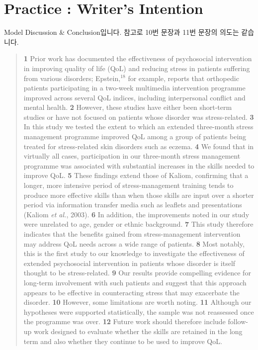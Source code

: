 \documentclass[10pt]{report}
\begin{document}
	\chapter{Practice : Writer's Intention}
	Model Discussion \& Conclusion입니다. 참고로 10번 문장과 11번 문장의 의도는 같습니다.
	\begin{quote}
		{\bf 1} Prior work has documented the effectiveness of psychosocial intervention in improving quality of life (QoL) and reducing stress in patients suffering from various disorders; Epstein,$^{18}$ for example, reports that orthopedic patients participating in a two-week multimedia intervention programme improved across several QoL indices, including interpersonal conflict and mental health. {\bf 2} However, these studies have either been short-term studies or have not focused on patients whose disorder was stress-related. {\bf 3} In this study we tested the extent to which an extended three-month stress management programme improved QoL among a group of patients being treated for stress-related skin disorders such as eczema. {\bf 4} We found that in virtually all cases, participation in our three-month stress management programme was associated with substantial increases in the skills needed to improve QoL. {\bf 5} These findings extend those of Kaliom, confirming that a longer, more intensive period of stress-management training tends to produce more effective skills than when those skills are input over a shorter period via information transfer media such as leaflets and presentations (Kaliom {\it et al.}, 2003). {\bf 6} In addition, the improvements noted in our study were unrelated to age, gender or ethnic background. {\bf 7} This study therefore indicates that the benefits gained from stress-management intervention may address QoL needs across a wide range of patients. {\bf 8} Most notably, this is the first study to our knowledge to investigate the effectiveness of extended psychosocial intervention in patients whose disorder is itself thought to be stress-related. {\bf 9} Our results provide compelling evidence for long-term involvement with such patients and suggest that this approach appears to be effective in counteracting stress that may exacerbate the disorder. {\bf 10} However, some limitations are worth noting. {\bf 11} Although our hypotheses were supported statistically, the sample was not reassessed once the programme was over. {\bf 12} Future work should therefore include follow-up work designed to evaluate whether the skills are retained in the long term and also whether they continue to be used to improve QoL.
	\end{quote}
\end{document}
